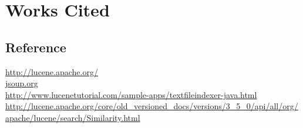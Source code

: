 \documentclass[12pt,letterpaper]{article}
\begin{document}
\section{Works Cited}
\subsection{Reference}
\url{http://lucene.apache.org/} \\
\url{jsoup.org} \\
\url{http://www.lucenetutorial.com/sample-apps/textfileindexer-java.html} \\
\url{http://lucene.apache.org/core/old_versioned_docs/versions/3_5_0/api/all/org/apache/lucene/search/Similarity.html} \\
\end{document}
